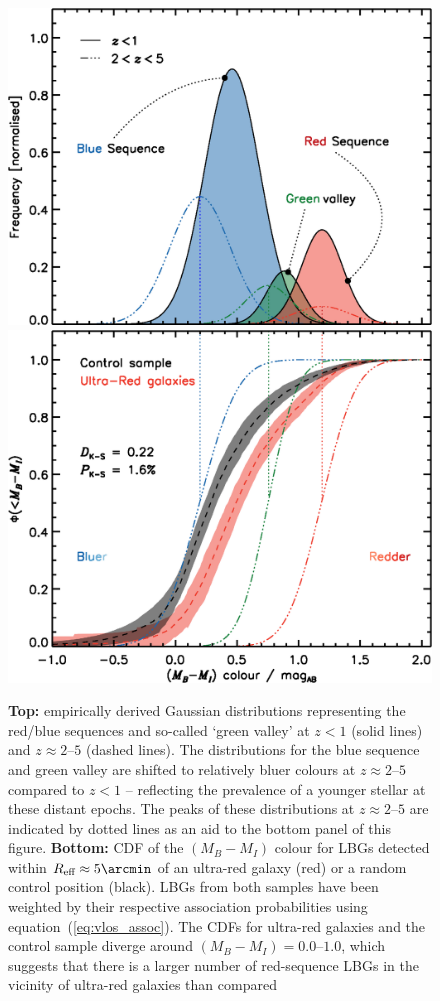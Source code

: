\documentclass[a4paper, fleqn, usenatbib]{mnras}
\newcommand{\reff}{R_{\text{eff}}}
\newcommand{\urg}{ultra-red galaxy}
\newcommand{\urgs}{ultra-red galaxies}
\begin{document}
\begin{figure}
    \includegraphics[width=\columnwidth]{nir_colour_template}\\
    \includegraphics[width=\columnwidth]{nir_colour}
    \caption{%
    \textbf{Top:} empirically derived Gaussian distributions representing the red/blue sequences and so-called `green valley' at $z<1$ (solid lines) and $z\approx2\text{--}5$ (dashed lines).
    The distributions for the blue sequence and green valley are shifted to relatively bluer colours at $z\approx2\text{--}5$ compared to $z<1$ -- reflecting the prevalence of a younger stellar at these distant epochs.
    The peaks of these distributions at $z\approx2\text{--}5$ are indicated by dotted lines as an aid to the bottom panel of this figure.
    \textbf{Bottom:} CDF of the $(M_B - M_I)$ colour for LBGs detected within $\reff{}\approx5\arcmin$ of an \urg{} (red) or a random control position (black).
    LBGs from both samples have been weighted by their respective association probabilities using equation~(\ref{eq:vlos_assoc}).
    The CDFs for \urgs{} and the control sample diverge around $(M_B - M_I)=0.0\text{--}1.0$, which suggests that there is a larger number of red-sequence LBGs in the vicinity of \urgs{} than compared}
    \label{fig:nir_colour}
\end{figure}
\end{document}
